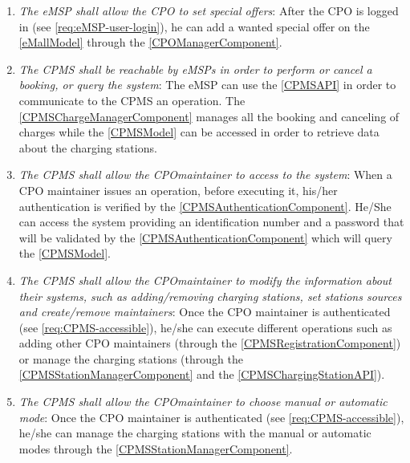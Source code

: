 \begin{enumerate}[label=\textbf{R\arabic*}]
            \label{req:eMSP-set-revenue}
      \item \textit{The \ac{eMSP} shall allow the \ac{CPO} to set special offers}:
            After the \ac{CPO} is logged in (see \ref{req:eMSP-user-login}), he can add a wanted special offer on the \ref{eMallModel} through the \ref{CPOManagerComponent}.
            \label{req:eMSP-set-special-offers}
      \item \textit{The \ac{CPMS} shall be reachable by \acp{eMSP} in order to perform or cancel a booking, or query the system}:
            The \ac{eMSP} can use the \ref{CPMSAPI} in order to communicate to the \ac{CPMS} an operation. The \ref{CPMSChargeManagerComponent} manages all the booking and canceling of charges while the \ref{CPMSModel} can be accessed in order to retrieve data about the charging stations.
            \label{req:CPMS-reachable}
      \item \textit{The \ac{CPMS} shall allow the \ac{CPO}maintainer to access to the system}:
            When a \ac{CPO} maintainer issues an operation, before executing it, his/her authentication is verified by the \ref{CPMSAuthenticationComponent}. He/She can access the system providing an identification number and a password that will be validated by the \ref{CPMSAuthenticationComponent} which will query the \ref{CPMSModel}.
            \label{req:CPMS-accessible}
      \item \textit{The \ac{CPMS} shall allow the \ac{CPO}maintainer to modify the information about their systems, such as adding/removing charging stations, set stations sources and create/remove maintainers}:
            Once the \ac{CPO} maintainer is authenticated (see \ref{req:CPMS-accessible}), he/she can execute different operations such as adding other \ac{CPO} maintainers (through the \ref{CPMSRegistrationComponent}) or manage the charging stations (through the \ref{CPMSStationManagerComponent} and the \ref{CPMSChargingStationAPI}).
            \label{req:CPMS-modify-cpo-infos}
      \item \textit{The \ac{CPMS} shall allow the \ac{CPO}maintainer to choose manual or automatic mode}:
            Once the \ac{CPO} maintainer is authenticated (see \ref{req:CPMS-accessible}), he/she can manage the charging stations with the manual or automatic modes through the \ref{CPMSStationManagerComponent}.
            \label{req:CPMS-select-mode}
\end{enumerate}
\clearpage